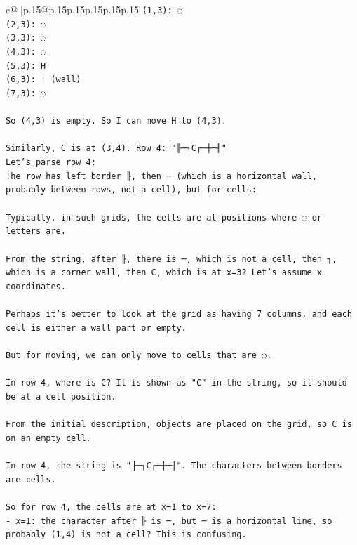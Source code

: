 \documentclass{article}
\begin{document}
{\begin{supertabular}{c@{$\;$}|p{.15\linewidth}@{}p{.15\linewidth}p{.15\linewidth}p{.15\linewidth}p{.15\linewidth}p{.15\linewidth}}
{{{\texttt{(1,3): ◌} \\
\texttt{(2,3): ◌} \\
\texttt{(3,3): ◌} \\
\texttt{(4,3): ◌} \\
\texttt{(5,3): H} \\
\texttt{(6,3): │ (wall)} \\
\texttt{(7,3): ◌} \\
\\ 
\texttt{So (4,3) is empty. So I can move H to (4,3).} \\
\\ 
\texttt{Similarly, C is at (3,4). Row 4: "╟─┐C┌─┼─╢"} \\
\texttt{Let's parse row 4:} \\
\texttt{The row has left border ╟, then ─ (which is a horizontal wall, probably between rows, not a cell), but for cells:} \\
\\ 
\texttt{Typically, in such grids, the cells are at positions where ◌ or letters are.} \\
\\ 
\texttt{From the string, after ╟, there is ─, which is not a cell, then ┐, which is a corner wall, then C, which is at x=3? Let's assume x coordinates.} \\
\\ 
\texttt{Perhaps it's better to look at the grid as having 7 columns, and each cell is either a wall part or empty.} \\
\\ 
\texttt{But for moving, we can only move to cells that are ◌.} \\
\\ 
\texttt{In row 4, where is C? It is shown as "C" in the string, so it should be at a cell position.} \\
\\ 
\texttt{From the initial description, objects are placed on the grid, so C is on an empty cell.} \\
\\ 
\texttt{In row 4, the string is "╟─┐C┌─┼─╢". The characters between borders are cells.} \\
\\ 
\texttt{So for row 4, the cells are at x=1 to x=7:} \\
\texttt{{-} x=1: the character after ╟ is ─, but ─ is a horizontal line, so probably (1,4) is not a cell? This is confusing.} \\
\\ 
}}}
\end{supertabular}}
\end{document}
